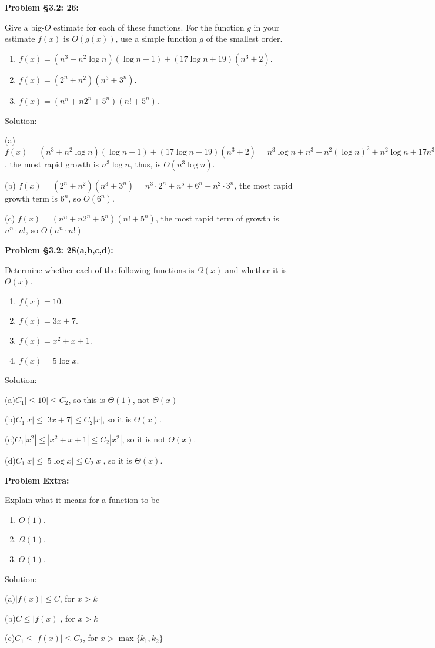\documentclass{article}
\newenvironment{problem}[1]
{\begin{mdframed}[default]
\textbf{Problem #1:}
}
{\end{mdframed}
}
\begin{document}
\begin{problem}{\S 3.2: 26}
Give a big-$O$ estimate for each of these functions. For the function $g$ in your
estimate $f(x)$ is $O(g(x))$, use a simple function $g$ of the smallest order.
\begin{enumerate}
\item[(a)] $f(x) = (n^3+n^2\log{n})(\log{n}+1) + (17\log{n} + 19)(n^3+2)$.
\item[(b)] $f(x) = (2^n + n^2)(n^3 + 3^n)$.
\item[(c)] $f(x) = (n^n + n2^n + 5^n)(n!+5^n)$.
\end{enumerate}

Solution:

(a) $f(x) = (n^3+n^2\log{n})(\log{n}+1) + (17\log{n} + 19)(n^3+2) = n^3\log{n} + n^3 + n^2(\log{n})^2 + n^2\log{n} + 17n^3\log{n}+34\log{n}+19n^3+38$, the most rapid growth is $n^3\log{n}$, thus, is $O(n^3\log{n})$.

(b) $f(x) = (2^n + n^2)(n^3 + 3^n) = n^3\cdot2^n+n^5+6^n+n^2\cdot3^n$, the most rapid growth term is $6^n$, so $O(6^n)$.

(c) $f(x) = (n^n + n2^n + 5^n)(n!+5^n)$, the most rapid term of growth is $n^n\cdot n!$, so $O(n^n\cdot n!)$
\end{problem}
\begin{problem}{\S 3.2: 28(a,b,c,d)}
Determine whether each of the following functions is $\Omega(x)$ and whether it is
$\Theta(x)$.
\begin{enumerate}
\item[(a)] $f(x) = 10$.
\item[(b)] $f(x) = 3x+7$.
\item[(c)] $f(x) = x^2 + x + 1$.
\item[(d)] $f(x) = 5\log{x}$.
\end{enumerate}

Solution:

(a)$C_1|\leq10|\leq C_2$, so this is $\Theta(1)$, not $\Theta(x)$

(b)$C_1|x|\leq|3x+7|\leq C_2|x|$, so it is $\Theta(x)$. 

(c)$C_1|x^2|\leq |x^2+x+1|\leq C_2|x^2|$, so it is not $\Theta(x)$. 

(d)$C_1|x|\leq|5\log{x}|\leq C_2|x|$, so it is $\Theta(x)$.

\end{problem}
\begin{problem}{Extra}
Explain what it means for a function to be
\begin{enumerate}
\item[(a)] $O(1)$.
\item[(b)] $\Omega(1)$.
\item[(c)] $\Theta(1)$.
\end{enumerate}
Solution:

(a)$|f(x)| \leq C$, for $x>k$

(b)$C\leq |f(x)|$, for $x>k$

(c)$C_1\leq |f(x)| \leq C_2$, for $x>\max\{k_1,k_2\}$

\end{problem}
\end{document}
